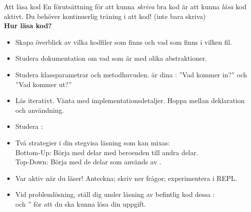 


\begin{Slide}{Att läsa kod} \SlideFontSmall
  En förutsättning för att kunna \emph{skriva} bra kod är att kunna \emph{läsa} kod aktivt. Du behöver kontinuerlig träning i att  kod! (inte bara skriva)\\ \vspace{0.5em}\textbf{Hur läsa kod?}
  \pause
  \begin{itemize}\SlideFontSmall
    \item Skapa överblick av vilka kodfiler som finns och vad som finns i vilken fil.
    \item Studera dokumentation om vad som är  med olika abstraktioner.
    \item Studera klassparametrar och metodhuvuden.  är dina : ''Vad kommer in?'' och ''Vad kommer ut?''
    \item Läs iterativt. Vänta med implementationsdetaljer. Hoppa mellan deklaration och användning.
    \item Studera : 
    \item Två strategier i din stegvisa läsning som kan mixas: \\Bottom-Up: Börja med delar med  beroenden till andra delar. \\ Top-Down: Börja med de delar som används av .
    \item Var aktiv när du läser! Anteckna; skriv ner frågor; experimentera i REPL.
    \item Vid problemlösning, ställ dig under läsning av befintlig kod dessa : \\  och '' för att du ska kunna lösa din uppgift.
  \end{itemize}
\end{Slide}

